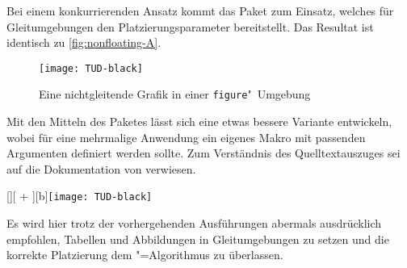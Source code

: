 \documentclass[%
  english,ngerman,%
  cdgeometry=no,DIV=12,%
  automark,%
  listof=toc,%
]{tudscrartcl}
\begin{document}
Bei einem konkurrierenden Ansatz kommt das Paket  zum Einsatz, 
welches für Gleitumgebungen den Platzierungsparameter  
bereitstellt. Das Resultat ist identisch zu \autoref{fig:nonfloating-A}.
%
\begin{Hint}
\begin{figure}[H]
\texttt{[image: TUD-black]}
\caption{Eine nichtgleitende Grafik in einer \texttt{figure}"~Umgebung}
\label{fig:nonfloating-B}
\end{figure}

\end{Hint}
%
Mit den Mitteln des Paketes  lässt sich eine etwas bessere 
Variante entwickeln, wobei für eine mehrmalige Anwendung ein eigenes Makro mit 
passenden Argumenten definiert werden sollte. Zum Verständnis des 
Quelltextauszuges sei auf die Dokumentation von  verwiesen.
%
\begin{Hint}
[\FBwidth][%
  \dimexpr\FBheight+\abovedisplayskip\relax%
][b]{\texttt{[image: TUD-black]}}{%
  \caption{%
    Eine nichtgleitende Grafik mit \texttt{\textbackslash floatbox}%
  }%
  \label{fig:nonfloating-C}%
}
\end{Hint}
\InputCode\noindent
%
Es wird hier trotz der vorhergehenden Ausführungen abermals ausdrücklich 
empfohlen, Tabellen und Abbildungen in Gleitumgebungen zu setzen und die 
korrekte Platzierung dem "=Algorithmus zu überlassen.
\end{document}
